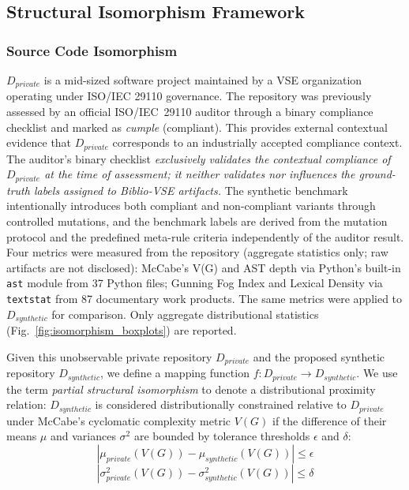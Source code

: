 \documentclass{ieeeaccess}
\begin{document}
\subsection{Structural Isomorphism Framework}
\label{sec:isomorphism}

\subsubsection{Source Code Isomorphism}

$D_{private}$ is a mid-sized software project maintained by a VSE organization operating under ISO/IEC 29110 governance. The repository was previously assessed by an official ISO/IEC~29110 auditor through a binary compliance checklist and marked as \emph{cumple} (compliant). This provides external contextual evidence that $D_{private}$ corresponds to an industrially accepted compliance context. The auditor's binary checklist \emph{exclusively validates the contextual compliance of $D_{private}$ at the time of assessment; it neither validates nor influences the ground-truth labels assigned to Biblio-VSE artifacts.} The synthetic benchmark intentionally introduces both compliant and non-compliant variants through controlled mutations, and the benchmark labels are derived from the mutation protocol and the predefined meta-rule criteria independently of the auditor result. Four metrics were measured from the repository (aggregate statistics only; raw artifacts are not disclosed): McCabe's V(G) and AST depth via Python's built-in \texttt{ast} module from 37 Python files; Gunning Fog Index and Lexical Density via \texttt{textstat} from 87 documentary work products. The same metrics were applied to $D_{synthetic}$ for comparison. Only aggregate distributional statistics (Fig.~\ref{fig:isomorphism_boxplots}) are reported.

Given this unobservable private repository $D_{private}$ and the proposed synthetic repository $D_{synthetic}$, we define a mapping function $f: D_{private} \rightarrow D_{synthetic}$. We use the term \emph{partial structural isomorphism} to denote a distributional proximity relation: $D_{synthetic}$ is considered distributionally constrained relative to $D_{private}$ under McCabe's cyclomatic complexity metric $V(G)$ if the difference of their means $\mu$ and variances $\sigma^2$ are bounded by tolerance thresholds $\epsilon$ and $\delta$:
\begin{equation}
|\mu_{private}(V(G)) - \mu_{synthetic}(V(G))| \leq \epsilon
\label{eq:mean_iso}
\end{equation}
\begin{equation}
|\sigma^2_{private}(V(G)) - \sigma^2_{synthetic}(V(G))| \leq \delta
\label{eq:var_iso}
\end{equation}
\end{document}
